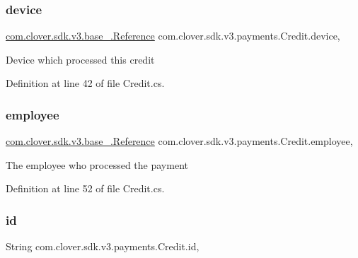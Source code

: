 \subsubsection{\texorpdfstring{device}{device}}
{\footnotesize\ttfamily \hyperlink{classcom_1_1clover_1_1sdk_1_1v3_1_1base___1_1_reference}{com.\+clover.\+sdk.\+v3.\+base\+\_\+.\+Reference} com.\+clover.\+sdk.\+v3.\+payments.\+Credit.\+device\hspace{0.3cm}{\ttfamily [get]}, {\ttfamily [set]}}



Device which processed this credit 



Definition at line 42 of file Credit.\+cs.

\mbox{\label{classcom_1_1clover_1_1sdk_1_1v3_1_1payments_1_1_credit_aafae65ef4b8afa39c532c844c4ad5470}} 
\subsubsection{\texorpdfstring{employee}{employee}}
{\footnotesize\ttfamily \hyperlink{classcom_1_1clover_1_1sdk_1_1v3_1_1base___1_1_reference}{com.\+clover.\+sdk.\+v3.\+base\+\_\+.\+Reference} com.\+clover.\+sdk.\+v3.\+payments.\+Credit.\+employee\hspace{0.3cm}{\ttfamily [get]}, {\ttfamily [set]}}



The employee who processed the payment 



Definition at line 52 of file Credit.\+cs.

\mbox{\label{classcom_1_1clover_1_1sdk_1_1v3_1_1payments_1_1_credit_af296ad7778f74b1ea14fe35908f04a5f}} 
\subsubsection{\texorpdfstring{id}{id}}
{\footnotesize\ttfamily String com.\+clover.\+sdk.\+v3.\+payments.\+Credit.\+id\hspace{0.3cm}{\ttfamily [get]}, {\ttfamily [set]}}



